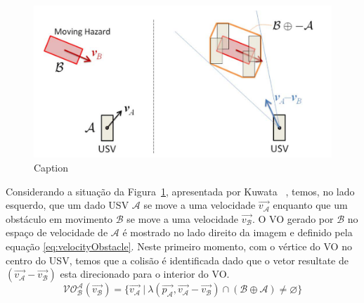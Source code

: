         \begin{figure}
            \centering
            \includegraphics[width=\textwidth]{fig/chap2/vo.png}
            \caption{Caption}
            \label{fig:Kuwata2014_vo}
        \end{figure}
        
        Considerando a situação da Figura~\ref{fig:Kuwata2014_vo}, apresentada por Kuwata \etal~\cite{KUWATA2014110}, temos, no lado esquerdo, que um dado USV $\mathcal{A}$ se move a uma velocidade $\vec{v_\mathcal{A}}$ enquanto que um obstáculo em movimento $\mathcal{B}$ se move a uma velocidade $\vec{v_\mathcal{B}}$. O VO gerado por $\mathcal{B}$ no espaço de velocidade de $\mathcal{A}$ é mostrado no lado direito da imagem e definido pela equação \eqref{eq:velocityObstacle}. Neste primeiro momento, com o vértice do VO no centro do USV, temos que a colisão é identificada dado que o vetor resultate de $(\vec{v_\mathcal{A}} - \vec{v_\mathcal{B}})$ esta direcionado para o interior do VO.
        \begin{equation}\label{eq:velocityObstacle}
            \mathcal{VO^A_B}(\vec{v_\mathcal{B}}) = \{\vec{v_\mathcal{A}}~|~\lambda(\vec{p_\mathcal{A}}, \vec{v_\mathcal{A}} - \vec{v_\mathcal{B}}) \cap (\mathcal{B} \oplus \mathcal{A}) \neq \varnothing\}
        \end{equation}